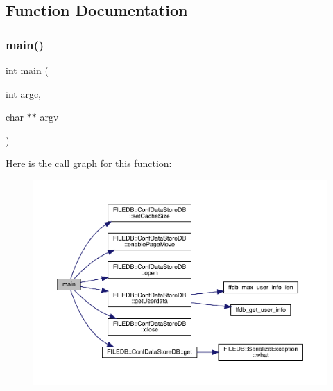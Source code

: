 \subsection{Function Documentation}
\mbox{\label{adat-devel_2other__libs_2filedb_2src_2ConfReadTest_8cpp_a3c04138a5bfe5d72780bb7e82a18e627}} 
\subsubsection{\texorpdfstring{main()}{main()}}
{\footnotesize\ttfamily int main (\begin{DoxyParamCaption}\item[{int}]{argc,  }\item[{char $\ast$$\ast$}]{argv }\end{DoxyParamCaption})}

Here is the call graph for this function\+:
\nopagebreak
\begin{figure}[H]
\begin{center}
\leavevmode
\includegraphics[width=350pt]{d3/d3b/adat-devel_2other__libs_2filedb_2src_2ConfReadTest_8cpp_a3c04138a5bfe5d72780bb7e82a18e627_cgraph}
\end{center}
\end{figure}
